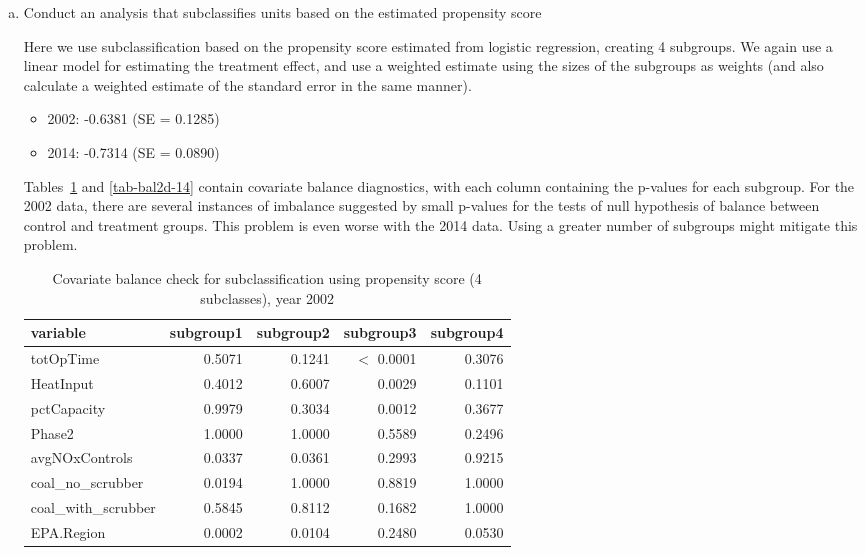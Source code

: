 \begin{enumerate}[(a)]
\item
  \begin{quoting}
    Conduct an analysis that subclassifies units based on the
    estimated propensity score
  \end{quoting}
  Here we use subclassification based on the propensity score
  estimated from logistic regression, creating 4 subgroups.  We again
  use a linear model for estimating the treatment effect, and use a
  weighted estimate using the sizes of the subgroups as weights (and
  also calculate a weighted estimate of the standard error in the same
  manner).
  \begin{itemize}
  \item 2002: -0.6381 (SE = 0.1285)
  \item 2014: -0.7314 (SE = 0.0890)
  \end{itemize}
  

  Tables~\ref{tab-bal2d-02} and \ref{tab-bal2d-14} contain covariate
  balance diagnostics, with each column containing the p-values for
  each subgroup.  For the 2002 data, there are several instances of
  imbalance suggested by small p-values for the tests of null
  hypothesis of balance between control and treatment groups.
  This problem is even worse with the 2014 data.  Using a greater
  number of subgroups might mitigate this problem.

  \begin{table}[ht]
    \centering
    \begin{tabular}{lrrrr}
      \toprule
      variable             & subgroup1 & subgroup2 & subgroup3  & subgroup4 \\ 
      \midrule
      totOpTime            & 0.5071    & 0.1241    & $<$ 0.0001 & 0.3076    \\ 
      HeatInput            & 0.4012    & 0.6007    & 0.0029     & 0.1101    \\ 
      pctCapacity          & 0.9979    & 0.3034    & 0.0012     & 0.3677    \\ 
      Phase2               & 1.0000    & 1.0000    & 0.5589     & 0.2496    \\ 
      avgNOxControls       & 0.0337    & 0.0361    & 0.2993     & 0.9215    \\ 
      coal\_no\_scrubber   & 0.0194    & 1.0000    & 0.8819     & 1.0000    \\ 
      coal\_with\_scrubber & 0.5845    & 0.8112    & 0.1682     & 1.0000        \\ 
      EPA.Region           & 0.0002    & 0.0104    & 0.2480     & 0.0530    \\ 
      \bottomrule
    \end{tabular}
    \caption{Covariate balance check for subclassification using propensity score (4 subclasses), year 2002} 
    \label{tab-bal2d-02}
  \end{table}


\end{enumerate}
